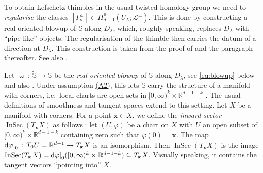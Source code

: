 \documentclass[11pt, a4paper]{article}
\numberwithin{theorem}{section}
\theoremstyle{remark}
\newcommand{\RR}{\mathbb{R}}
\DeclareMathOperator{\IS}{InSec}
\renewcommand{\d}{\mathrm{d}}
\renewcommand{\L}{\mathcal{L}}
\newcommand{\bb}[1]{\boldsymbol{#1}}
\newcommand{\lf}{\mathrm{lf}}
\newcommand{\Sc}{\mathbb{S}}
\newcommand\restr[2]{{%
  \left.\kern-\nulldelimiterspace %
  #1 %
  \littletaller %
  \right|_{#2} %
  }}
\newcommand{\littletaller}{\mathchoice{\vphantom{\big|}}{}{}{}}
\theoremstyle{theorem}
\begin{document}
To obtain Lefschetz thimbles in the usual twisted homology group we need to \emph{regularise} the classes $[\Gamma^\pm_\sigma] \in H^{\lf}_{d-1}(U_\lambda;\L^\pm)$. This is done by constructing a real oriented blowup of $\Sc$ along $D_\lambda$, which, roughly speaking, replaces $D_\lambda$ with ``pipe-like'' objects. The regularisation of the thimble then carries the datum of a direction at $D_\lambda$. This construction is taken from the proof of \cite[Lemma 4.2]{matsubara2023localization} and the paragraph thereafter. See also \cite[\S 3.2.5]{aomoto2011theory}.\par

Let $\varpi\,:\, \widetilde{\Sc} \rightarrow \Sc$ be the \emph{real oriented blowup} of $\Sc$ along $D_\lambda$, see \eqref{eq:blowup} below and also \cite[\S 8.2]{sabbah2012introduction}. Under assumption \hyperref[ass:A2]{(A2)}, this lets $\widetilde{\Sc}$ carry the structure of a manifold with corners, i.e.\ local charts are open sets in $[0,\infty)^k \times \RR^{d-1-k}$ \cite[Definition 2.1]{joyce2009manifolds}. 
The usual definitions of smoothness and tangent spaces extend to this setting. Let $X$ be a manifold with corners. For a point $\bb{x}\in X$, we define the \emph{inward sector} $\IS(T_{\bb{x}}X)$ as follows \cite[Definition 2.2]{joyce2009manifolds}: let $(U, \varphi)$ be a chart on $X$ with $U$ an open subset of $[0,\infty)^k \times \RR^{d-1-k}$ containing zero such that $\varphi(0) = \bb{x}$. 
The map $\restr{\d\varphi}{0}\,:\, T_0U = \RR^{d-1} \rightarrow T_{\bb{x}}X$ is an isomorphism. Then $\IS(T_{\bb{x}}X)$ is the image $\IS(T_{\bb{x}}X) = \restr{\d\varphi}{0}([0,\infty)^k \times \RR^{d-1-k}) \subseteq T_{\bb{x}}X$. Visually speaking, it contains the tangent vectors ``pointing into'' $X$.\par 
\end{document}
